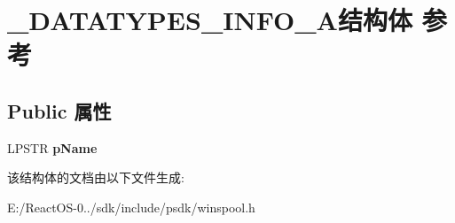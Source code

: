 \hypertarget{struct___d_a_t_a_t_y_p_e_s___i_n_f_o__1_a}{}\section{\+\_\+\+D\+A\+T\+A\+T\+Y\+P\+E\+S\+\_\+\+I\+N\+F\+O\+\_\+A结构体 参考}
\label{struct___d_a_t_a_t_y_p_e_s___i_n_f_o__1_a}
\subsection*{Public 属性}
\begin{DoxyCompactItemize}
\item 
\mbox{\label{struct___d_a_t_a_t_y_p_e_s___i_n_f_o__1_a_af41c5b61de699b4771b98632e3666384}} 
L\+P\+S\+TR {\bfseries p\+Name}
\end{DoxyCompactItemize}


该结构体的文档由以下文件生成\+:\begin{DoxyCompactItemize}
\item 
E\+:/\+React\+O\+S-\/0../sdk/include/psdk/winspool.\+h\end{DoxyCompactItemize}
